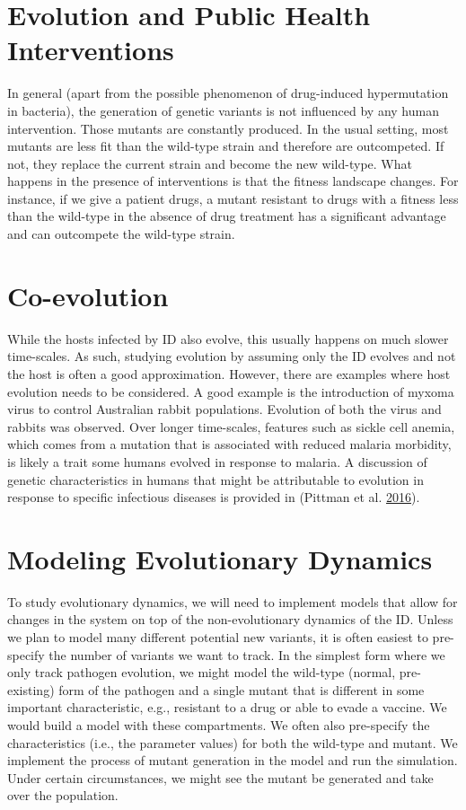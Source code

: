\documentclass[]{book}
\theoremstyle{definition}
\theoremstyle{definition}
\theoremstyle{definition}
\theoremstyle{remark}
\begin{document}
\section{Evolution and Public Health
Interventions}\label{evolution-and-public-health-interventions}

In general (apart from the possible phenomenon of drug-induced
hypermutation in bacteria), the generation of genetic variants is not
influenced by any human intervention. Those mutants are constantly
produced. In the usual setting, most mutants are less fit than the
wild-type strain and therefore are outcompeted. If not, they replace the
current strain and become the new wild-type. What happens in the
presence of interventions is that the fitness landscape changes. For
instance, if we give a patient drugs, a mutant resistant to drugs with a
fitness less than the wild-type in the absence of drug treatment has a
significant advantage and can outcompete the wild-type strain.

\section{Co-evolution}\label{co-evolution}

While the hosts infected by ID also evolve, this usually happens on much
slower time-scales. As such, studying evolution by assuming only the ID
evolves and not the host is often a good approximation. However, there
are examples where host evolution needs to be considered. A good example
is the introduction of myxoma virus to control Australian rabbit
populations. Evolution of both the virus and rabbits was observed. Over
longer time-scales, features such as sickle cell anemia, which comes
from a mutation that is associated with reduced malaria morbidity, is
likely a trait some humans evolved in response to malaria. A discussion
of genetic characteristics in humans that might be attributable to
evolution in response to specific infectious diseases is provided in
(Pittman et al. \protect\hyperlink{ref-pittman16}{2016}).

\section{Modeling Evolutionary
Dynamics}\label{modeling-evolutionary-dynamics}

To study evolutionary dynamics, we will need to implement models that
allow for changes in the system on top of the non-evolutionary dynamics
of the ID. Unless we plan to model many different potential new
variants, it is often easiest to pre-specify the number of variants we
want to track. In the simplest form where we only track pathogen
evolution, we might model the wild-type (normal, pre-existing) form of
the pathogen and a single mutant that is different in some important
characteristic, e.g., resistant to a drug or able to evade a vaccine. We
would build a model with these compartments. We often also pre-specify
the characteristics (i.e., the parameter values) for both the wild-type
and mutant. We implement the process of mutant generation in the model
and run the simulation. Under certain circumstances, we might see the
mutant be generated and take over the population.
\end{document}
